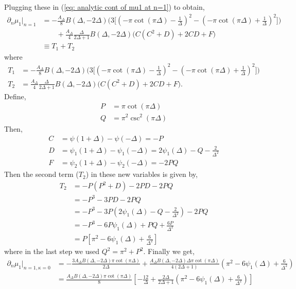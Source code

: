 \documentclass[11pt]{article}
\newcommand{\p}{\partial}
\newcommand{\nn}{\nonumber}
\newcommand{\lb}{\left(}
\newcommand{\rb}{\right)}
\begin{document}
Plugging these in (\ref{eq: analytic cont of mu1 at n=1}) to obtain,
\begin{align}
    \p_n \mu_1 \big|_{n=1} &= -\frac{A_\Delta}{8} B(\Delta, -2\Delta)\Bigg( 3  \Big[ \lb -\pi \cot(\pi \Delta) - \frac{1}{\Delta} \rb^2 - \lb -\pi \cot(\pi \Delta) + \frac{1}{\Delta} \rb^2\Big] \Bigg) \nn \\ 
    &\qquad +\frac{A_\Delta}{4}\frac{\Delta}{2\Delta+1} B(\Delta, -2\Delta) \Big(  C(C^2 + D) + 2CD + F \Big) \\
    & \equiv T_1 + T_2 
\end{align}
where 
\begin{align}
    T_1 &= -\frac{A_\Delta}{8} B(\Delta, -2\Delta)\Bigg( 3  \Big[ \lb -\pi \cot(\pi \Delta) - \frac{1}{\Delta} \rb^2 - \lb -\pi \cot(\pi \Delta) + \frac{1}{\Delta} \rb^2\Big] \Bigg) \\
    T_2 &= \frac{A_\Delta}{4}\frac{\Delta}{2\Delta+1} B(\Delta, -2\Delta) \Big(  C(C^2 + D) + 2CD + F \Big) .
\end{align}
Define,
\begin{align}
    P &= \pi \cot(\pi \Delta)\\
    Q&= \pi^2 \csc^2(\pi \Delta)
\end{align}
Then,
\begin{align}
    C &= \psi(1+\Delta) - \psi(-\Delta) = -P \\
    D & = \psi_1(1+\Delta) - \psi_1(-\Delta) = 2\psi_1(\Delta ) - Q -\frac{2}{\Delta^2} \\ 
    F &= \psi_2(1+\Delta) - \psi_2(-\Delta) = -2PQ
\end{align}
Then the second term ($T_2$) in these new variables is given by,
\begin{align}
    T_2 &= -P(P^2 + D) -2PD - 2PQ \nn \\
    &= -P^3 -3PD -2PQ \nn \\
    &= -P^3  -3P(2\psi_1(\Delta) - Q - \frac{2}{\Delta^2}) - 2PQ\nn \\
    &= -P^3 -6P\psi_1(\Delta) + PQ + \frac{6P}{\Delta^2} \nn \\
    &= P\left[ \pi^2 -6\psi_1(\Delta) + \frac{6}{\Delta^2} \right]
\end{align}
where in the last step we used $Q^2 = \pi^2 + P^2$. 
Finally we get,
\begin{align}
    \p_n \mu_1 \big|_{n=1, \kappa = 0} &= -\frac{3A_\Delta B(\Delta,-2\Delta)\pi \cot(\pi\Delta)}{2\Delta} + \frac{A_\Delta B(\Delta,-2\Delta) \Delta \pi \cot(\pi \Delta)}{4(2\Delta +1)} \lb \pi^2 -6\psi_1(\Delta) + \frac{6}{\Delta^2} \rb \nn \\
    &= \frac{A_\Delta B(\Delta,-2\Delta)\pi \cot(\pi\Delta)}{8}\left[ -\frac{12}{\Delta} + \frac{2\Delta }{2\Delta + 1} \lb \pi^2 -6\psi_1(\Delta) + \frac{6}{\Delta^2} \rb  \right]
\end{align}
\end{document}
